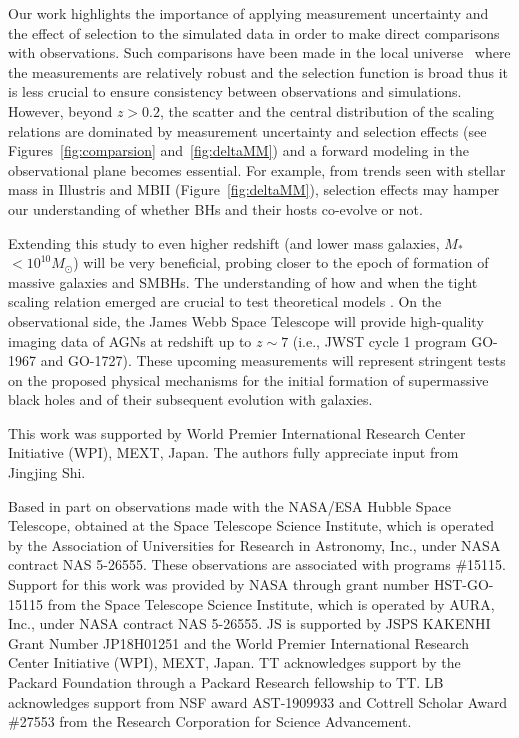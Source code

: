 \documentclass[twocolumn]{aastex631}
\def\smass{{$M_*$}}
\begin{document}
Our work highlights the importance of applying measurement uncertainty and the effect of selection to the simulated data in order to make direct comparisons with observations. Such comparisons have been made in the local universe~\citep[e.g.,][]{Habouzit2021} where the measurements are relatively robust and the selection function is broad thus it is less crucial to ensure consistency between observations and simulations. However, beyond $z>0.2$, the scatter and the central distribution of the scaling relations are dominated by measurement uncertainty and selection effects (see Figures~\ref{fig:comparsion} and~\ref{fig:deltaMM}) and a forward modeling in the observational plane becomes essential. For example, from trends seen with stellar mass in Illustris and MBII (Figure~\ref{fig:deltaMM}), selection effects may hamper our understanding of whether BHs and their hosts co-evolve or not.

Extending this study to even higher redshift (and lower mass galaxies, \smass\ $<10^{10}M_{\odot}$) will be very beneficial, probing closer to the epoch of formation of massive galaxies and SMBHs. The understanding of how and when the tight scaling relation emerged are crucial to test theoretical models \citep{Volonteri2021}. On the observational side, the James Webb Space Telescope will provide high-quality imaging data of AGNs at redshift up to $z\sim7$ (i.e., JWST cycle 1 program GO-1967 and GO-1727). These upcoming measurements will represent stringent tests on the proposed physical mechanisms for the initial formation of supermassive black holes and of their subsequent evolution with galaxies.

\begin{acknowledgments}
This work was supported by World Premier International Research Center Initiative (WPI), MEXT, Japan. 
The authors fully appreciate input from Jingjing Shi.

Based in part on observations made with the NASA/ESA Hubble Space Telescope, obtained at the Space Telescope Science Institute, which is operated by the Association of Universities for Research in Astronomy, Inc., under NASA contract NAS 5-26555. These observations are associated with programs \#15115. Support for this work was provided by NASA through grant number HST-GO-15115 from the Space Telescope Science Institute, which is operated by AURA, Inc., under NASA contract NAS 5-26555. 
JS is supported by JSPS KAKENHI Grant Number JP18H01251 and the World Premier International Research Center Initiative (WPI), MEXT, Japan. TT acknowledges support by the Packard Foundation through a Packard Research fellowship to TT. LB acknowledges support from NSF award AST-1909933 and Cottrell Scholar Award \#27553 from the Research Corporation for Science Advancement.
\end{acknowledgments}
\end{document}
